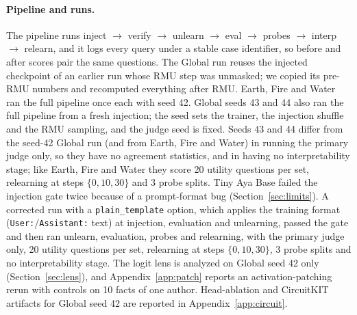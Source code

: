 \documentclass[10pt,twocolumn]{article}
\newcommand{\code}[1]{\texttt{#1}}
\begin{document}
\paragraph{Pipeline and runs.} The pipeline runs inject $\rightarrow$ verify $\rightarrow$ unlearn $\rightarrow$ eval $\rightarrow$ probes $\rightarrow$ interp $\rightarrow$ relearn, and it logs every query under a stable case identifier, so before and after scores pair the same questions. The Global run reuses the injected checkpoint of an earlier run whose RMU step was unmasked; we copied its pre-RMU numbers and recomputed everything after RMU. Earth, Fire and Water ran the full pipeline once each with seed 42. Global seeds 43 and 44 also ran the full pipeline from a fresh injection; the seed sets the trainer, the injection shuffle and the RMU sampling, and the judge seed is fixed. Seeds 43 and 44 differ from the seed-42 Global run (and from Earth, Fire and Water) in running the primary judge only, so they have no agreement statistics, and in having no interpretability stage; like Earth, Fire and Water they score 20 utility questions per set, relearning at steps $\{0,10,30\}$ and 3 probe splits. Tiny Aya Base failed the injection gate twice because of a prompt-format bug (Section~\ref{sec:limits}). A corrected run with a \code{plain\_template} option, which applies the training format (\code{User:}/\code{Assistant:} text) at injection, evaluation and unlearning, passed the gate and then ran unlearn, evaluation, probes and relearning, with the primary judge only, 20 utility questions per set, relearning at steps $\{0,10,30\}$, 3 probe splits and no interpretability stage. The logit lens is analyzed on Global seed 42 only (Section~\ref{sec:lens}), and Appendix~\ref{app:patch} reports an activation-patching rerun with controls on 10 facts of one author. Head-ablation and CircuitKIT artifacts for Global seed 42 are reported in Appendix~\ref{app:circuit}.
\end{document}
